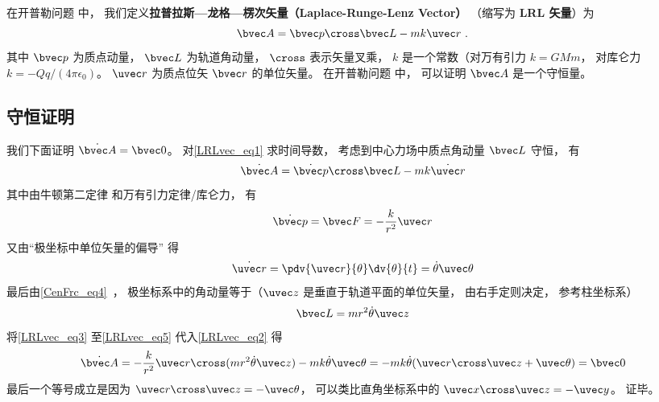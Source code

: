 

在开普勒问题%
中， 我们定义\textbf{拉普拉斯—龙格—楞次矢量（Laplace-Runge-Lenz Vector）} （缩写为 \textbf{LRL 矢量}）为
\begin{equation}\label{LRLvec_eq1}
\bvec A = \bvec p \cross \bvec L - mk \uvec r~.
\end{equation}
其中 $\bvec p$ 为质点动量， $\bvec L$ 为轨道角动量， $\cross$ 表示矢量叉乘， $k$ 是一个常数（对万有引力 $k = GMm$， 对库仑力 $k = -Qq/(4\pi\epsilon_0)$。 $\uvec r$ 为质点位矢 $\bvec r$ 的单位矢量。 在开普勒问题%
中， 可以证明 $\bvec A$ 是一个守恒量。

\subsection{守恒证明}
我们下面证明 $\dot{\bvec A} = \bvec 0$。 对\autoref{LRLvec_eq1} 求时间导数， 考虑到中心力场中质点角动量 $\bvec L$ 守恒， 有
\begin{equation}\label{LRLvec_eq2}
\dot{\bvec A} = \dot{\bvec p}\cross \bvec L  - mk\dot{\uvec r}
\end{equation}
其中由牛顿第二定律 和万有引力定律/库仑力， 有
\begin{equation}\label{LRLvec_eq3}
\dot{\bvec p} = \bvec F = - \frac{k}{r^2}\uvec r
\end{equation}
又由“极坐标中单位矢量的偏导” 得
\begin{equation}\label{LRLvec_eq4}
\dot{\uvec r} = \pdv{\uvec r}{\theta} \dv{\theta}{t} = \dot\theta\uvec \theta
\end{equation}
最后由\autoref{CenFrc_eq4}~， 极坐标系中的角动量等于（$\uvec z$ 是垂直于轨道平面的单位矢量， 由右手定则决定， 参考柱坐标系）
\begin{equation}\label{LRLvec_eq5}
\bvec L = mr^2\dot \theta \uvec z
\end{equation}
将\autoref{LRLvec_eq3} 至\autoref{LRLvec_eq5} 代入\autoref{LRLvec_eq2} 得
\begin{equation}
\dot{\bvec A} = -\frac{k}{r^2}\uvec r \cross (mr^2\dot\theta\uvec z) - mk\dot\theta\uvec\theta
=-mk\dot\theta (\uvec r\cross \uvec z + \uvec \theta)
= \bvec 0
\end{equation}
最后一个等号成立是因为 $\uvec r\cross\uvec z = -\uvec\theta$， 可以类比直角坐标系中的 $\uvec x\cross\uvec z = -\uvec y$。 证毕。


